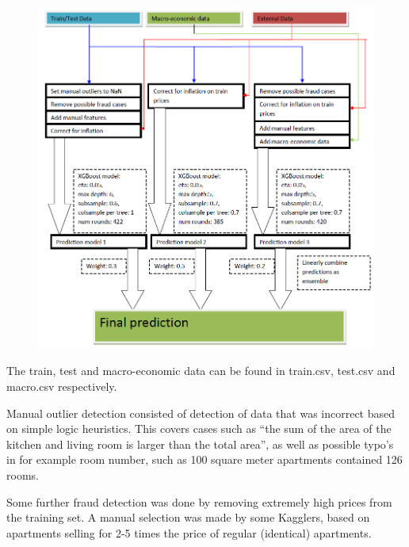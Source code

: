 \documentclass[a4paper,11pt,twocolumn]{article}
\begin{document}
\begin{figure}[H]
\centering
\includegraphics[width=\textwidth]{ensemble.png}
\label{fig:ens}
\end{figure}

The train, test and macro-economic data can be found in train.csv, test.csv and
macro.csv respectively.

Manual outlier detection consisted of detection of data that was incorrect based
on simple logic heuristics. This covers cases such as ``the sum of the area of
the kitchen and living room is larger than the total area'', as well as possible
typo's in for example room number, such as 100 square meter apartments contained
126 rooms.

Some further fraud detection was done by removing extremely high prices from the
training set. A manual selection was made by some Kagglers, based on apartments
selling for 2-5 times the price of regular (identical) apartments.
\end{document}

